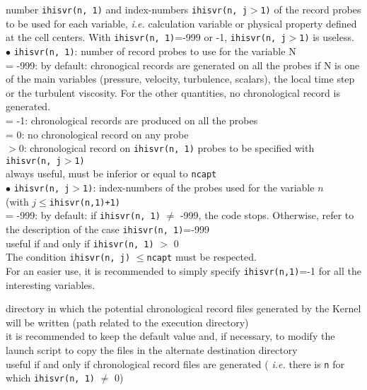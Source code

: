{number {\tt ihisvr(n, 1)} and index-numbers {\tt ihisvr(n, j$>$1)} of the record
probes to be used for each variable, {\em i.e.} calculation variable
or physical property defined at the cell centers.
With {\tt ihisvr(n, 1)}=-999 or -1, {\tt ihisvr(n, j$>$1)} is useless.\\
\hspace*{.5cm} $\bullet$ {\tt ihisvr(n, 1)}: number of record probes to use
for the variable N\\
\hspace*{1.3cm}= -999: by default: chronogical records are generated on
all the probes if N is one of the main variables (pressure, velocity,
turbulence, scalars), the local time step or the turbulent
viscosity. For the other quantities, no chronological record is generated.\\
\hspace*{1.3cm}= -1: chronological records are produced on all the probes\\
\hspace*{1.3cm}= 0: no chronological record on any probe\\
\hspace*{1.3cm}$>0$: chronological record on {\tt ihisvr(n, 1)} probes to be
specified with  {\tt ihisvr(n, j$>$1)}\\
always useful, must be inferior or equal to {\tt ncapt}\\
\hspace*{.5cm} $\bullet$ {\tt ihisvr(n, j$>$1)}: index-numbers of the probes
used for the variable $n$\\
(with $j$$\leqslant${\tt ihisvr(n,1)+1)}\\
\hspace*{1.3cm}= -999: by default: if {\tt ihisvr(n, 1)} $\ne$
-999, the  code stops. Otherwise, refer to the description of the case
{\tt ihisvr(n, 1)}=-999\\
useful if and only if {\tt ihisvr(n, 1)} $>$ 0 \\
The condition {\tt ihisvr(n, j)} $\leqslant${\tt ncapt} must be respected.\\
For an easier use, it is recommended to simply specify {\tt ihisvr(n,1)}=-1 for
all the interesting variables.}

{directory in which the potential chronological record files generated by
the Kernel will be written (path related to the execution directory)\\
it is recommended to keep the default value and, if necessary, to modify the
launch script to copy the files in the alternate destination directory\\
useful if and only if chronological record files are generated ({\em
i.e.} there is {\tt n} for which {\tt ihisvr(n, 1)} $\ne$ 0)}

